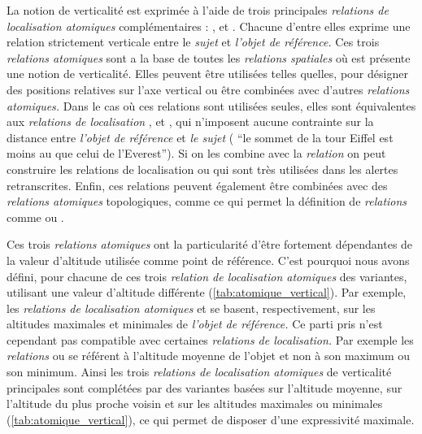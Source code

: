 La notion de verticalité est exprimée à l'aide de trois principales
\emph{relations de localisation atomiques} complémentaires :
,
 et
. Chacune
d'entre elles exprime une relation strictement verticale entre le
\emph{sujet} et \emph{l'objet de référence.} Ces trois \emph{relations
  atomiques} sont a la base de toutes les \emph{relations spatiales}
où est présente une notion de verticalité. Elles peuvent être
utilisées telles quelles, pour désigner des positions relatives sur
l'axe vertical ou être combinées avec d'autres \emph{relations
  atomiques.} Dans le cas où ces relations sont utilisées seules,
elles sont équivalentes aux \emph{relations de localisation}
,
 et
, qui n'imposent aucune contrainte sur
la distance entre \emph{l'objet de référence} et \emph{le sujet} (\eg
\enquote{le sommet de la tour Eiffel est moins au que celui de
  l’Everest}). Si on les combine avec la \emph{relation}
 on peut construire les
relations de localisation  ou
 qui sont très utilisées dans
les alertes retranscrites. Enfin, ces relations peuvent également être
combinées avec des \emph{relations atomiques} topologiques, comme
 ce qui permet la définition de
\emph{relations} comme  ou
.

Ces trois \emph{relations atomiques} ont la particularité d'être
fortement dépendantes de la valeur d'altitude utilisée comme point de
référence. C'est pourquoi nous avons défini, pour chacune de ces trois
\emph{relation de localisation atomiques} des variantes, utilisant une
valeur d'altitude différente (\autoref{tab:atomique_vertical}). Par
exemple, les \emph{relations de localisation atomiques}
 et
 se
basent, respectivement, sur les altitudes maximales et minimales de
\emph{l'objet de référence.} Ce parti pris n'est cependant pas
compatible avec certaines \emph{relations de localisation.} Par
exemple les \emph{relations}
 ou
 se référent à l'altitude
moyenne de l'objet et non à son maximum ou son minimum. Ainsi les
trois \emph{relations de localisation atomiques} de verticalité
principales sont complétées par des variantes basées sur l'altitude
moyenne, sur l'altitude du plus proche voisin et sur les altitudes
maximales ou minimales (\autoref{tab:atomique_vertical}), ce qui
permet de disposer d'une expressivité maximale.


